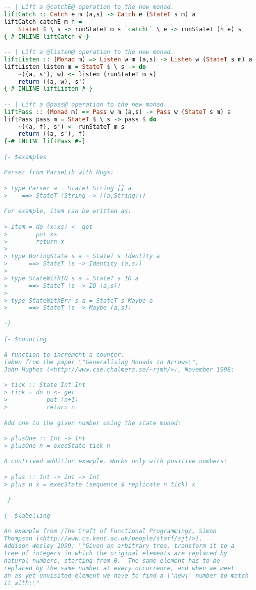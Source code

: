 \begin{lstlisting}[language=Haskell]
-- | Lift a @catchE@ operation to the new monad.
liftCatch :: Catch e m (a,s) -> Catch e (StateT s m) a
liftCatch catchE m h =
    StateT $ \ s -> runStateT m s `catchE` \ e -> runStateT (h e) s
{-# INLINE liftCatch #-}

-- | Lift a @listen@ operation to the new monad.
liftListen :: (Monad m) => Listen w m (a,s) -> Listen w (StateT s m) a
liftListen listen m = StateT $ \ s -> do
    ~((a, s'), w) <- listen (runStateT m s)
    return ((a, w), s')
{-# INLINE liftListen #-}

-- | Lift a @pass@ operation to the new monad.
liftPass :: (Monad m) => Pass w m (a,s) -> Pass w (StateT s m) a
liftPass pass m = StateT $ \ s -> pass $ do
    ~((a, f), s') <- runStateT m s
    return ((a, s'), f)
{-# INLINE liftPass #-}

{- $examples

Parser from ParseLib with Hugs:

> type Parser a = StateT String [] a
>    ==> StateT (String -> [(a,String)])

For example, item can be written as:

> item = do (x:xs) <- get
>        put xs
>        return x
>
> type BoringState s a = StateT s Identity a
>      ==> StateT (s -> Identity (a,s))
>
> type StateWithIO s a = StateT s IO a
>      ==> StateT (s -> IO (a,s))
>
> type StateWithErr s a = StateT s Maybe a
>      ==> StateT (s -> Maybe (a,s))

-}

{- $counting

A function to increment a counter.
Taken from the paper \"Generalising Monads to Arrows\",
John Hughes (<http://www.cse.chalmers.se/~rjmh/>), November 1998:

> tick :: State Int Int
> tick = do n <- get
>           put (n+1)
>           return n

Add one to the given number using the state monad:

> plusOne :: Int -> Int
> plusOne n = execState tick n

A contrived addition example. Works only with positive numbers:

> plus :: Int -> Int -> Int
> plus n x = execState (sequence $ replicate n tick) x

-}

{- $labelling

An example from /The Craft of Functional Programming/, Simon
Thompson (<http://www.cs.kent.ac.uk/people/staff/sjt/>),
Addison-Wesley 1999: \"Given an arbitrary tree, transform it to a
tree of integers in which the original elements are replaced by
natural numbers, starting from 0.  The same element has to be
replaced by the same number at every occurrence, and when we meet
an as-yet-unvisited element we have to find a \'new\' number to match
it with:\"


\end{lstlisting}
